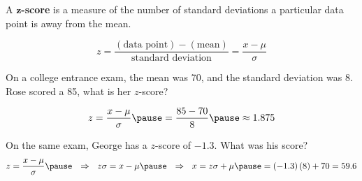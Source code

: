 \documentclass{beamer}
\begin{document}
\begin{frame}
\begin{definition}
A \textbf{$\boldsymbol{z}$-score} is a measure of the number of standard deviations a particular data point is away from the mean.

\vspace{-2mm}
\begin{equation*}
z=\dfrac{\left(\text{data point}\right)-\left(\text{mean}\right)}{\text{standard deviation}}=\dfrac{x-\mu}{\sigma}
\end{equation*}
\end{definition}\pause

\begin{example}
On a college entrance exam, the mean was 70, and the standard deviation was 8. Rose scored a 85, what is her $z$-score?\pause

\vspace{-2mm}
\begin{equation*}
z=\dfrac{x-\mu}{\sigma}\pause=\dfrac{85-70}{8}\pause\approx 1.875
\end{equation*}

\vspace{-4.3mm}
\end{example}\pause

\vspace{-2mm}
\begin{example}
On the same exam, George has a $z$-score of $-1.3$. What was his score?\pause
\begin{equation*}
z=\dfrac{x-\mu}{\sigma}\pause
~~\Rightarrow~~
z\sigma=x-\mu\pause
~~\Rightarrow~~
x=z\sigma+\mu\pause = \left(-1.3\right)\left(8\right)+70=59.6
\end{equation*}

\vspace{-4.5mm}
\end{example}
\end{frame}
\end{document}

